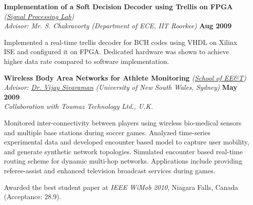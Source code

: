 \documentclass[margin,line]{resume}
\begin{document}
\begin{resume}
    \textbf{Implementation of a Soft Decision Decoder using Trellis on FPGA}
    \emph{(\href{http://www.iitr.ac.in/departments/ECE/pages/Research+Facilities+labs+Singnal_Processing.html}
    {Signal Processing Lab})}   						\\
    \hspace{-1pt}\emph{Advisor: Mr. S. Chakravorty (Department of ECE, IIT Roorkee)}	\hfill \textbf{Aug 2009} 	\\\vspace{-4mm}
    \begin{list2}
    \item Implemented a real-time trellis decoder for BCH codes using VHDL on Xilinx ISE and configured it on FPGA.
    Dedicated hardware was shown to achieve higher data rate compared to software implementation.
    \end{list2}
\vspace{-2mm}

    \textbf{Wireless Body Area Networks for Athlete Monitoring}
    \emph{(\href{http://www.eet.unsw.edu.au/}{School of EE\&T})}					\\
    \hspace{-1pt}\emph{Advisor: \href{http://www2.ee.unsw.edu.au/~vijay/}{Dr. Vijay Sivaraman}
    (University of New South Wales, Sydney)} 			\hfill \textbf{May 2009} 	\\
    \emph{Collaboration with Toumaz Technology Ltd., U.K.} 		 \\\vspace{-4mm}
    \begin{list2}
    \item Monitored inter-connectivity between players using wireless bio-medical sensors and
    multiple base stations during soccer games. Analyzed time-series experimental data
    and developed encounter based model to capture user mobility, and generate synthetic network topologies.
    Simulated encounter based real-time routing scheme for dynamic multi-hop networks.
    Applications include providing referee-assist and enhanced television broadcast services during games.
    \item Awarded the best student paper at \emph{IEEE WiMob 2010}, Niagara Falls, Canada (Acceptance: 28.9).
    \end{list2}
\vspace{-2mm}


\end{resume}
\end{document}
